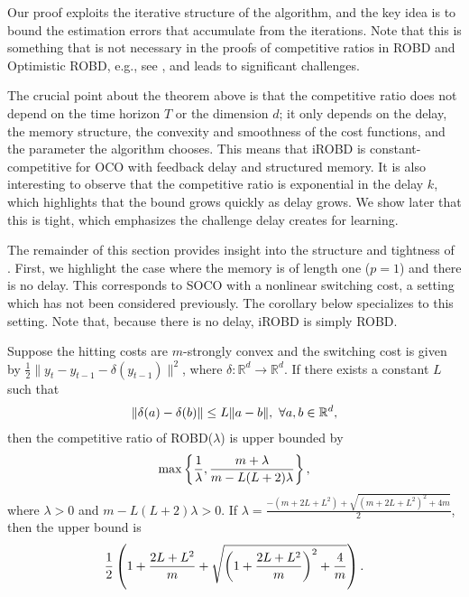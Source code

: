 Our proof  exploits the iterative structure of the algorithm, and the key idea is to bound the estimation errors that accumulate from the iterations. Note that this is something that is not necessary in the proofs of competitive ratios in ROBD and Optimistic ROBD, e.g., see \citep{shi2020online}, and leads to significant challenges.

The crucial point about the theorem above is that the competitive ratio does not depend on the time horizon $T$ or the dimension $d$; it only depends on the delay, the memory structure, the convexity and smoothness of the cost functions, and the parameter the algorithm chooses. This means that iROBD is constant-competitive for OCO with feedback delay and structured memory.  It is also interesting to observe that the competitive ratio is exponential in the delay $k$, which highlights that the bound grows quickly as delay grows.  We show later that this is tight, which emphasizes the challenge delay creates for learning. 

The remainder of this section provides insight into the structure and tightness of .  First, we highlight the case where the memory is of length one ($p=1$) and there is no delay.  This corresponds to SOCO with a nonlinear switching cost, a setting which has not been considered previously. The corollary below specializes  to this setting. Note that, because there is no delay, iROBD is simply ROBD.

\begin{corollary}\label{c.nonlinear} 
Suppose the hitting costs are $m$-strongly convex and the switching cost is given by $\frac{1}{2}\|y_t-y_{t-1}-\delta(y_{t-1})\|^2$, where $\delta:\mathbb{R}^d\to\mathbb{R}^d$. If there exists a constant $L$ such that
\begin{align}
     \|\delta(a)-\delta(b)\|\le L\|a-b\|,~\forall a,b\in\mathbb{R}^d,\notag
\end{align}
then the competitive ratio of ROBD($\lambda$) is upper bounded by
\begin{align}
     \max\left\{\frac{1}{\lambda},\frac{m+\lambda}{m-L(L+2)\lambda}\right\},\notag
\end{align}
where $\lambda>0$ and $m-L(L+2)\lambda>0$. If $\lambda = \frac{-(m+2L+L^2)+\sqrt{(m+2L+L^2)^2+4m}}{2}$, then the upper bound is \begin{align}
    \frac{1}{2}\left(1+\frac{2L+L^2}{m}+\sqrt{\left(1+\frac{2L+L^2}{m}\right)^2+\frac{4}{m}}\right).\notag
\end{align}
\end{corollary}


